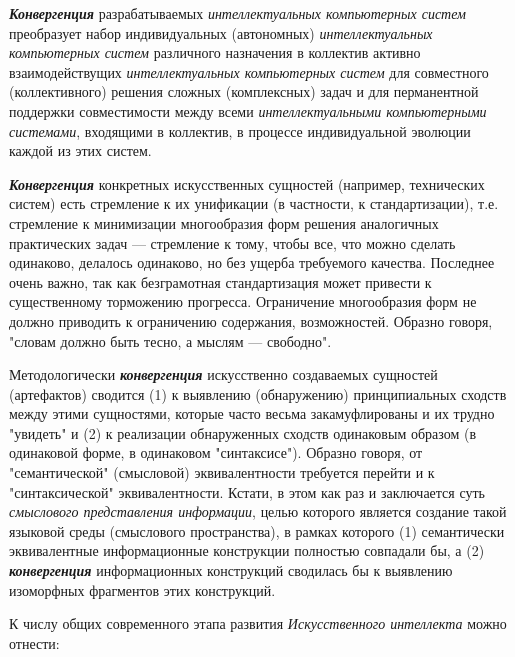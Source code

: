 \textbf{\textit{Конвергенция}} разрабатываемых \textit{интеллектуальных компьютерных систем} преобразует набор индивидуальных (автономных) \textit{интеллектуальных компьютерных систем} различного назначения в коллектив активно взаимодействущих \textit{интеллектуальных компьютерных систем} для совместного (коллективного) решения сложных (комплексных) задач и для перманентной поддержки совместимости между всеми \textit{интеллектуальными компьютерными системами}, входящими в коллектив, в процессе индивидуальной эволюции каждой из этих систем.

\textbf{\textit{Конвергенция}} конкретных искусственных сущностей (например, технических систем) есть стремление к их унификации (в частности, к стандартизации), т.е. стремление к минимизации многообразия форм решения аналогичных практических задач --- стремление к тому, чтобы все, что можно сделать одинаково, делалось одинаково, но без ущерба требуемого качества. Последнее очень важно, так как безграмотная стандартизация может привести к существенному торможению прогресса. Ограничение многообразия форм не должно приводить к ограничению содержания, возможностей. Образно говоря, "словам должно быть тесно, а мыслям --- свободно"{}.

Методологически \textbf{\textit{конвергенция}} искусственно создаваемых сущностей (артефактов) сводится (1) к выявлению (обнаружению) принципиальных сходств между этими сущностями, которые часто весьма закамуфлированы и их трудно "увидеть"{} и (2) к реализации обнаруженных сходств одинаковым образом (в одинаковой форме, в одинаковом "синтаксисе"{}). Образно говоря, от "семантической"{} (смысловой) эквивалентности требуется перейти и к "синтаксической"{} эквивалентности. Кстати, в этом как раз и заключается суть \textit{смыслового представления информации}, целью которого является создание такой языковой среды (смыслового пространства), в рамках которого (1) семантически эквивалентные информационные конструкции полностью совпадали бы, а (2) \textbf{\textit{конвергенция}} информационных конструкций сводилась бы к выявлению изоморфных фрагментов этих конструкций.

К числу общих  современного этапа развития \textit{Искусственного интеллекта} можно отнести:

